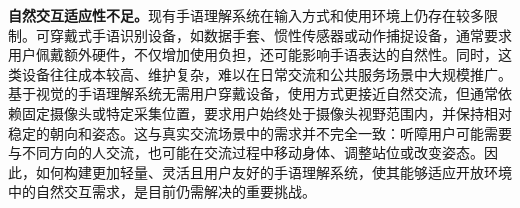 \textbf{自然交互适应性不足。}现有手语理解系统在输入方式和使用环境上仍存在较多限制。可穿戴式手语识别设备，如数据手套、惯性传感器或动作捕捉设备，通常要求用户佩戴额外硬件，不仅增加使用负担，还可能影响手语表达的自然性。同时，这类设备往往成本较高、维护复杂，难以在日常交流和公共服务场景中大规模推广。基于视觉的手语理解系统无需用户穿戴设备，使用方式更接近自然交流，但通常依赖固定摄像头或特定采集位置，要求用户始终处于摄像头视野范围内，并保持相对稳定的朝向和姿态。这与真实交流场景中的需求并不完全一致：听障用户可能需要与不同方向的人交流，也可能在交流过程中移动身体、调整站位或改变姿态。因此，如何构建更加轻量、灵活且用户友好的手语理解系统，使其能够适应开放环境中的自然交互需求，是目前仍需解决的重要挑战。


